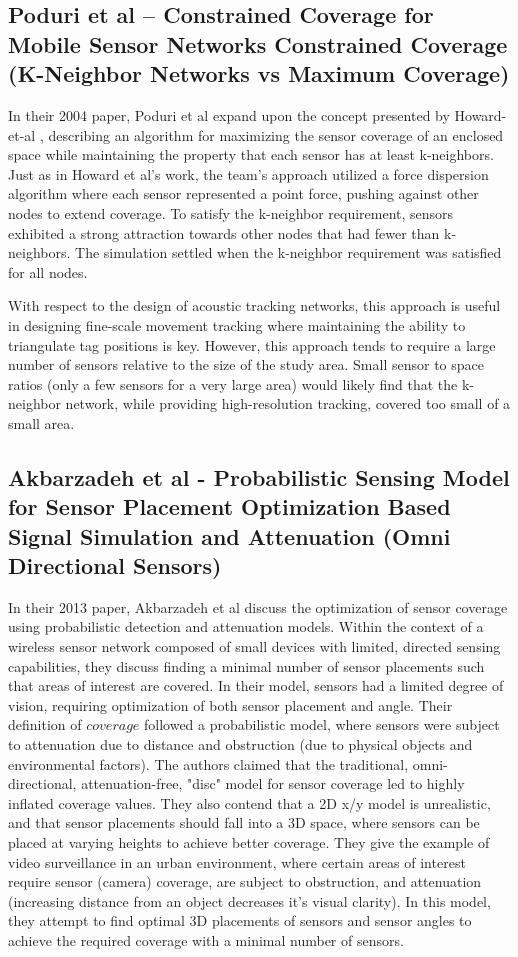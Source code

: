 \subsection{Poduri et al – Constrained Coverage for Mobile Sensor Networks Constrained Coverage (K-Neighbor Networks vs Maximum Coverage)}
In their 2004 paper, Poduri et al\cite{Poduri2004} expand upon the concept presented by Howard-et-al \cite{Howard2002}, describing an algorithm for maximizing the sensor coverage of an enclosed space while maintaining the property that each sensor has at least k-neighbors. Just as in Howard et al's work, the team's approach utilized a force dispersion algorithm where each sensor represented a point force, pushing against other nodes to extend coverage.  To satisfy the k-neighbor requirement, sensors exhibited a strong attraction towards other nodes that had fewer than k-neighbors.  The simulation settled when the k-neighbor requirement was satisfied for all nodes.  

With respect to the design of acoustic tracking networks, this approach is useful in designing fine-scale movement tracking where maintaining the ability to triangulate tag positions is key.  However, this approach tends to require a large number of sensors relative to the size of the study area.  Small sensor to space ratios (only a few sensors for a very large area) would likely find that the k-neighbor network, while providing high-resolution tracking, covered too small of a small area.

\subsection{Akbarzadeh et al - Probabilistic Sensing Model for Sensor Placement Optimization Based Signal Simulation and Attenuation (Omni Directional Sensors)}
In their 2013 paper, Akbarzadeh et al\cite{Akbarzadeh2013} discuss the optimization of sensor coverage using probabilistic detection and attenuation models.  Within the context of a wireless sensor network composed of small devices with limited, directed sensing capabilities, they discuss finding a minimal number of sensor placements such that areas of interest are covered.  In their model, sensors had a limited degree of vision, requiring optimization of both sensor placement and angle.  Their definition of $coverage$ followed a probabilistic model, where sensors were subject to attenuation due to distance and obstruction (due to physical objects and environmental factors).  The authors claimed that the traditional, omni-directional, attenuation-free, "disc" model for sensor coverage led to highly inflated coverage values.  They also contend that a 2D x/y model is unrealistic, and that sensor placements should fall into a 3D space, where sensors can be placed at varying heights to achieve better coverage.  They give the example of video surveillance in an urban environment, where certain areas of interest require sensor (camera) coverage, are subject to obstruction, and attenuation (increasing distance from an object decreases it's visual clarity).  In this model, they attempt to find optimal 3D placements of sensors and sensor angles to achieve the required coverage with a minimal number of sensors. 

